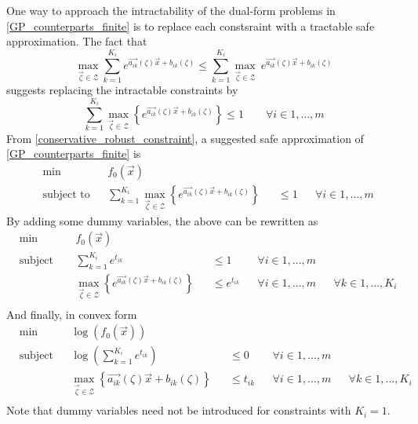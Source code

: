 One way to approach the intractability of the dual-form problems in \eqref{GP_counterparts_finite} is to replace each constsraint with a tractable safe approximation. The fact that
$$\max_{\vec{\zeta} \in \mathcal{Z}} \textstyle{\sum}_{k=1}^{K_i}e^{\vec{a_{ik}}\left(\zeta\right)\vec{x} + b_{ik}\left(\zeta\right)} \leq \sum_{k=1}^{K_i} {\displaystyle \max_{\vec{\zeta} \in \mathcal{Z}}}\ e^{\vec{a_{ik}}\left(\zeta\right)\vec{x} + b_{ik}\left(\zeta\right)}$$
suggests replacing the intractable constraints by 
\begin{equation}
	\sum_{k=1}^{K_i}\max_{\vec{\zeta} \in \mathcal{Z}} \left\{e^{\vec{a_{ik}}\left(\zeta\right)\vec{x} + b_{ik}\left(\zeta\right)}\right\} \leq 1 \qquad \forall i \in 1,...,m
	\label{conservative_robust_constraint}
\end{equation}
From \eqref{conservative_robust_constraint}, a suggested safe approximation of  \eqref{GP_counterparts_finite} is
\begin{equation}
\begin{aligned}
& \min &&f_0\left(\vec{x}\right)\\
& \text{subject to} &&\textstyle{\sum}_{k=1}^{K_i} {\displaystyle \max_{\vec{\zeta} \in \mathcal{Z}}} \left\{e^{\vec{a_{ik}}\left(\zeta\right)\vec{x} + b_{ik}\left(\zeta\right)}\right\} &&\leq 1 &&\forall i \in 1,...,m
\end{aligned}
\label{GP_safe_conservative}
\end{equation}
By adding some dummy variables, the above can be rewritten as
\begin{equation}
\begin{aligned}
& \min &&f_0\left(\vec{x}\right)\\
& \text{subject to} &&\textstyle{\sum}_{k=1}^{K_i}e^{t_{ik}} &&\leq 1 &&\forall i \in 1,...,m \\
& &&\max_{\vec{\zeta} \in \mathcal{Z}} \left\{e^{\vec{a_{ik}}\left(\zeta\right)\vec{x} + b_{ik}\left(\zeta\right)}\right\} &&\leq e^{t_{ik}} &&\forall i \in 1,...,m &&\forall k \in 1,...,K_i\\
\end{aligned}
\label{GP_safe_decoupled}
\end{equation}
And finally, in convex form
\begin{equation}
\begin{aligned}
& \min &&\log\left(f_0\left(\vec{x}\right)\right)\\
& \text{subject to} &&\log(\textstyle{\sum}_{k=1}^{K_i}e^{t_{ik}}) &&\leq 0 &&\forall i \in 1,...,m \\
& &&\max_{\vec{\zeta} \in \mathcal{Z}} \left\{\vec{a_{ik}}\left(\zeta\right)\vec{x} + b_{ik}\left(\zeta\right)\right\} &&\leq t_{ik} &&\forall i \in 1,...,m &&\forall k \in 1,...,K_i\\
\end{aligned}
\label{GP_safe_convex}
\end{equation}
Note that dummy variables need not be introduced for constraints with $K_i = 1$.
 
